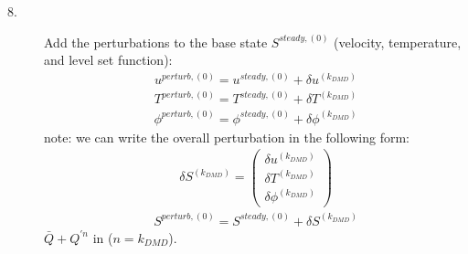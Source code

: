 \documentclass[]{article}
\begin{document}
\begin{description}
	\item[8.] Add the perturbations to the base 
		state $S^{steady,(0)}$ (velocity, temperature, and 
		level set function):
                \begin{eqnarray}
                u^{perturb,(0)}=u^{steady,(0)}+\delta u^{(k_{DMD})}
                \end{eqnarray}
                \begin{eqnarray}
		T^{perturb,(0)}=T^{steady,(0)}+\delta T^{(k_{DMD})}
                \end{eqnarray}
                \begin{eqnarray}
                \phi^{perturb,(0)}=\phi^{steady,(0)}+
			\delta \phi^{(k_{DMD})}
                \end{eqnarray}
		note: we can write the overall perturbation in the
		following form:
                \begin{eqnarray}
			\delta S^{(k_{DMD})}=\left(
			\begin{array}{c}
                         \delta u^{(k_{DMD})} \\
                         \delta T^{(k_{DMD})} \\
			 \delta \phi^{(k_{DMD})}
			\end{array} \right)
                \end{eqnarray}
                \begin{eqnarray}
                S^{perturb,(0)}=S^{steady,(0)}+\delta S^{(k_{DMD})}
                \end{eqnarray}
                $\bar{Q}+Q^{\prime n}$ in \cite{RANJAN2020109076}
                ($n=k_{DMD}$).


\end{description}
\end{document}
